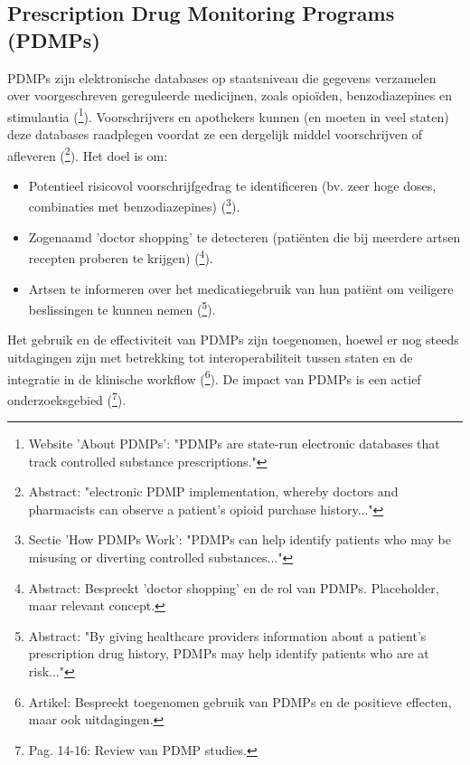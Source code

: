 \documentclass[11pt, a4paper]{report} %
\begin{document}
\subsection{Prescription Drug Monitoring Programs (PDMPs)}
PDMPs zijn elektronische databases op staatsniveau die gegevens verzamelen over voorgeschreven gereguleerde medicijnen, zoals opioïden, benzodiazepines en stimulantia (\cite{CDCPDMPs}\footnote{Website 'About PDMPs': "PDMPs are state-run electronic databases that track controlled substance prescriptions."}). Voorschrijvers en apothekers kunnen (en moeten in veel staten) deze databases raadplegen voordat ze een dergelijk middel voorschrijven of afleveren (\cite{Guth2022GeographicSpilloverPDMP}\footnote{Abstract: "electronic PDMP implementation, whereby doctors and pharmacists can observe a patient’s opioid purchase history..."}). Het doel is om:
\begin{itemize}
    \item Potentieel risicovol voorschrijfgedrag te identificeren (bv. zeer hoge doses, combinaties met benzodiazepines) (\cite{CDCPDMPs}\footnote{Sectie 'How PDMPs Work': "PDMPs can help identify patients who may be misusing or diverting controlled substances..."}).
    \item Zogenaamd 'doctor shopping' te detecteren (patiënten die bij meerdere artsen recepten proberen te krijgen) (\cite{Simeone2017DoctorShopping}\footnote{Abstract: Bespreekt 'doctor shopping' en de rol van PDMPs. Placeholder, maar relevant concept.}).
    \item Artsen te informeren over het medicatiegebruik van hun patiënt om veiligere beslissingen te kunnen nemen (\cite{Horwitz2018DataQualityPDMP}\footnote{Abstract: "By giving healthcare providers information about a patient’s prescription drug history, PDMPs may help identify patients who are at risk..."}).
\end{itemize}
Het gebruik en de effectiviteit van PDMPs zijn toegenomen, hoewel er nog steeds uitdagingen zijn met betrekking tot interoperabiliteit tussen staten en de integratie in de klinische workflow (\cite{AAFP2024OpioidDecrease}\footnote{Artikel: Bespreekt toegenomen gebruik van PDMPs en de positieve effecten, maar ook uitdagingen.}). De impact van PDMPs is een actief onderzoeksgebied (\cite{Maclean2020EconomicStudiesOpioid}\footnote{Pag. 14-16: Review van PDMP studies.}).
\end{document}
